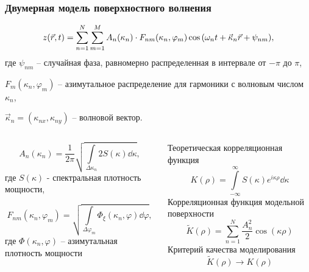 \documentclass[10pt,pdf,hyperref={unicode}, dvipsnames]{beamer}
\renewcommand{\phi}{\varphi}
\begin{document}
\begin{frame}[t]

\frametitle{Двумерная модель поверхностного волнения}


\begin{equation}
    \label{eq:surface2d}
    z(\vec r,t) = \sum\limits_{n=1}^{N} \sum\limits_{m=1}^{M}
    A_n(\kappa_n) \cdot
    F_{nm}(\kappa_n,\phi_m) \cos \qty(\omega_n t + \vec \kappa_n \vec r + \psi_{nm}),
\end{equation}
\footnotesize
где $\psi_{nm}$ -- случайная фаза, равномерно распределенная в интервале от
$-\pi$
до $ \pi$, 

$F_m(\kappa_n, \phi_m)$ -- азимутальное
распределение для гармоники с волновым числом  $\kappa_n$,  

$\vec \kappa_n =
(\kappa_{nx}, \kappa_{ny})$ -- 
волновой вектор. 

\begin{columns}[t]
    \begin{column}{0.49\linewidth}
    \footnotesize
    \begin{equation}
        \label{eq:Amplitude}
        A_n(\kappa_n) = \frac{1}{2 \pi} \sqrt{\int\limits_{\Delta \kappa_n} 2
            S(\kappa)
        \dd \kappa},
    \end{equation}
     где  $S(\kappa)$  - спектральная плотность
    мощности,

    \begin{equation}
        F_{nm}(\kappa_n,\phi_m) = \sqrt{\int\limits_{\Delta \phi_m}
        \Phi_{\xi}(\kappa_n,\phi) \dd \phi},
        \end{equation}
     где  $\Phi(\kappa_n, \phi)$   -- { азимутальная плотность
        мощности}
    \end{column}
    \begin{column}[T]{0.49\linewidth}
        \footnotesize
        Теоретическая корреляционная функция
        \begin{equation}
            K(\rho) = \int\limits_{-\infty}^{\infty} S(\kappa) e^{i \kappa
            \rho}\dd  \kappa
        \end{equation}
        Корреляционная функция модельной поверхности
        \begin{equation}
            \tilde K(\rho) = \sum\limits_{n=1}^{N} \frac{A_n^2}{2} \cos(\kappa \rho)
        \end{equation}
        Критерий качества моделирования
        \begin{equation}
            \tilde K(\rho) \longrightarrow K(\rho)
        \end{equation}
    \end{column}
\end{columns}
\end{frame}
\end{document}
